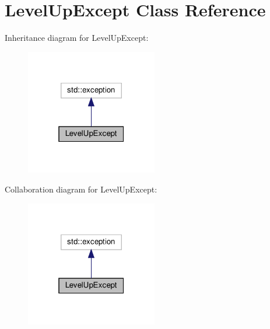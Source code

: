 \hypertarget{classLevelUpExcept}{}\section{Level\+Up\+Except Class Reference}
\label{classLevelUpExcept}


Inheritance diagram for Level\+Up\+Except\+:
\nopagebreak
\begin{figure}[H]
\begin{center}
\leavevmode
\includegraphics[width=163pt]{classLevelUpExcept__inherit__graph}
\end{center}
\end{figure}


Collaboration diagram for Level\+Up\+Except\+:
\nopagebreak
\begin{figure}[H]
\begin{center}
\leavevmode
\includegraphics[width=163pt]{classLevelUpExcept__coll__graph}
\end{center}
\end{figure}
